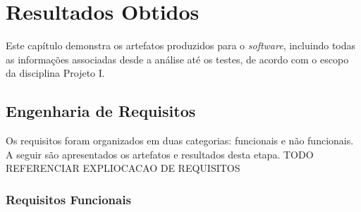 \chapter{Resultados Obtidos}
Este capítulo demonstra os artefatos produzidos para o \textit{software}, incluindo todas as informações associadas desde a análise até os testes, de acordo com o escopo da disciplina Projeto I.

\section{Engenharia de Requisitos}

Os requisitos foram organizados em duas categorias: funcionais e não funcionais. A seguir são apresentados os artefatos e resultados desta etapa.
 TODO REFERENCIAR EXPLIOCACAO DE REQUISITOS
\subsection{Requisitos Funcionais}

